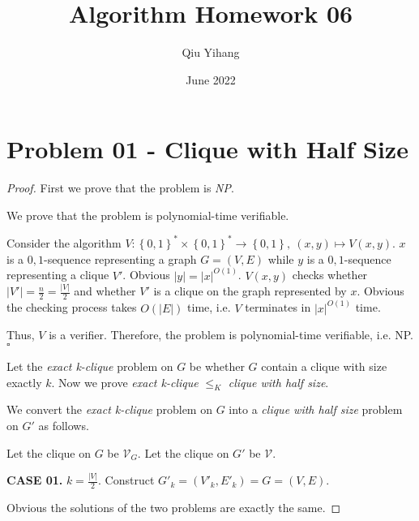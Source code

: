 \documentclass{article}
\title{\textbf{Algorithm Homework 06}}
\author{Qiu Yihang}
\date{June 2022}
\newcommand{\whiteqed}{\hfill $\square$\par}
\newcommand{\set}[1]{\left\{#1\right\}}
\begin{document}
\maketitle

\section{Problem 01 - Clique with Half Size}
\vspace{1em}
\begin{proof}
    First we prove that the problem is \textit{NP}.
    
    \hspace{1.3em}
    We prove that the problem is polynomial-time verifiable.
    
    \hspace{1.3em}
    Consider the algorithm $V:\set{0,1}^*\times\set{0,1}^*\rightarrow \set{0,1},\ (x,y)\mapsto V(x,y)$. $x$ is a $0,1$-sequence representing a graph $G=(V,E)$ while $y$ is a $0,1$-sequence representing a clique $V'$. Obvious $|y|=|x|^{O(1)}$. $V(x,y)$ checks whether $|V'|=\frac{n}{2}=\frac{|V|}{2}$ and whether $V'$ is a clique on the graph represented by $x$. Obvious the checking process takes $O(|E|)$ time, i.e. $V$ terminates in $|x|^{O(1)}$ time.
    
    \hspace{1.3em}
    Thus, $V$ is a verifier. Therefore, the problem is polynomial-time verifiable, i.e. NP. \whiteqed
    
    \vspace{1.5em} \hspace{1.3em}
    Let the \textit{exact k-clique} problem on $G$ be whether $G$ contain a clique with size exactly $k$. Now we prove \textit{exact k-clique} $\le_{K}$ \textit{clique with half size}. 
    
    \hspace{1.3em}
    We convert the \textit{exact k-clique} problem on $G$ into a \textit{clique with half size} problem on $G'$ as follows.
    
    \hspace{1.3em}
    Let the clique on $G$ be $\mathcal{V}_G$. Let the clique on $G'$ be $\mathcal{V}$.
    
    \hspace{1.3em}
    \textbf{CASE 01.} $k=\frac{|V|}{2}$. Construct $G'_k=(V'_k,E'_k)=G=(V,E)$. 
    
    \hspace{6.6em}
    Obvious the solutions of the two problems are exactly the same.
    

\end{proof}
\end{document}
